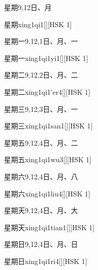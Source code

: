 \begin{entry}{星期}{9,12}{⽇、⽉}
  \begin{phonetics}{星期}{xing1qi1}[][HSK 1]
  \end{phonetics}
\end{entry}

\begin{entry}{星期一}{9,12,1}{⽇、⽉、⼀}
  \begin{phonetics}{星期一}{xing1qi1yi1}[][HSK 1]
  \end{phonetics}
\end{entry}

\begin{entry}{星期二}{9,12,2}{⽇、⽉、⼆}
  \begin{phonetics}{星期二}{xing1qi1'er4}[][HSK 1]
  \end{phonetics}
\end{entry}

\begin{entry}{星期三}{9,12,3}{⽇、⽉、⼀}
  \begin{phonetics}{星期三}{xing1qi1san1}[][HSK 1]
  \end{phonetics}
\end{entry}

\begin{entry}{星期五}{9,12,4}{⽇、⽉、⼆}
  \begin{phonetics}{星期五}{xing1qi1wu3}[][HSK 1]
  \end{phonetics}
\end{entry}

\begin{entry}{星期六}{9,12,4}{⽇、⽉、⼋}
  \begin{phonetics}{星期六}{xing1qi1liu4}[][HSK 1]
  \end{phonetics}
\end{entry}

\begin{entry}{星期天}{9,12,4}{⽇、⽉、⼤}
  \begin{phonetics}{星期天}{xing1qi1tian1}[][HSK 1]
  \end{phonetics}
\end{entry}

\begin{entry}{星期日}{9,12,4}{⽇、⽉、⽇}
  \begin{phonetics}{星期日}{xing1qi1ri4}[][HSK 1]
  \end{phonetics}
\end{entry}

